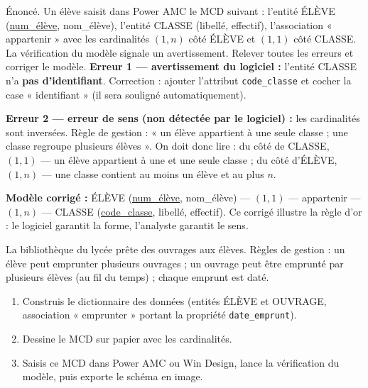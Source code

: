 \documentclass[11pt]{article}
\begin{document}
\begin{exoresolu}
Énoncé. Un élève saisit dans Power AMC le MCD suivant : l'entité \textsf{ÉLÈVE} (\underline{num\_élève}, nom\_élève), l'entité \textsf{CLASSE} (libellé, effectif), l'association « appartenir » avec les cardinalités $(1,n)$ côté ÉLÈVE et $(1,1)$ côté CLASSE. La vérification du modèle signale un avertissement. Relever toutes les erreurs et corriger le modèle.
\tcblower
\textbf{Erreur 1 — avertissement du logiciel :} l'entité \textsf{CLASSE} n'a \textbf{pas d'identifiant}. Correction : ajouter l'attribut \texttt{code\_classe} et cocher la case « identifiant » (il sera souligné automatiquement).

\textbf{Erreur 2 — erreur de sens (non détectée par le logiciel) :} les cardinalités sont inversées. Règle de gestion : « un élève appartient à une seule classe ; une classe regroupe plusieurs élèves ». On doit donc lire : du côté de CLASSE, $(1,1)$ — un élève appartient à une et une seule classe ; du côté d'ÉLÈVE, $(1,n)$ — une classe contient au moins un élève et au plus $n$.

\textbf{Modèle corrigé :} \textsf{ÉLÈVE} (\underline{num\_élève}, nom\_élève) --- $(1,1)$ --- \textsf{appartenir} --- $(1,n)$ --- \textsf{CLASSE} (\underline{code\_classe}, libellé, effectif). Ce corrigé illustre la règle d'or : le logiciel garantit la forme, l'analyste garantit le sens.
\end{exoresolu}

\begin{exercice}
La bibliothèque du lycée prête des ouvrages aux élèves. Règles de gestion : un élève peut emprunter plusieurs ouvrages ; un ouvrage peut être emprunté par plusieurs élèves (au fil du temps) ; chaque emprunt est daté.
\begin{enumerate}
\item Construis le dictionnaire des données (entités ÉLÈVE et OUVRAGE, association « emprunter » portant la propriété \texttt{date\_emprunt}).
\item Dessine le MCD sur papier avec les cardinalités.
\item Saisis ce MCD dans Power AMC ou Win Design, lance la vérification du modèle, puis exporte le schéma en image.
\end{enumerate}
\end{exercice}
\end{document}
